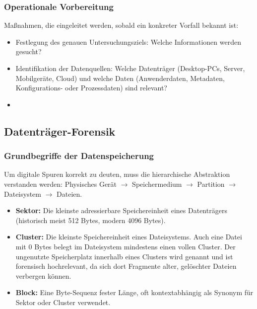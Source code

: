 \documentclass[
../../css_summary.tex,
]{subfiles}
\begin{document}
\subsubsection{Operationale Vorbereitung}
Maßnahmen, die eingeleitet werden, sobald ein konkreter Vorfall bekannt ist:
\begin{itemize}
  \item Festlegung des genauen Untersuchungsziels: Welche Informationen werden gesucht?
  \item Identifikation der Datenquellen: Welche Datenträger (Desktop-PCs, Server, Mobilgeräte, Cloud) und welche Daten (Anwenderdaten, Metadaten, Konfigurations- oder Prozessdaten) sind relevant?
  \item %
\end{itemize}

\subsection{Datenträger-Forensik}

\subsubsection{Grundbegriffe der Datenspeicherung}
Um digitale Spuren korrekt zu deuten, muss die hierarchische Abstraktion verstanden werden: Physisches Gerät $\rightarrow$ Speichermedium $\rightarrow$ Partition $\rightarrow$ Dateisystem $\rightarrow$ Dateien.

\begin{defbox}[Speichereinheiten]
  \begin{itemize}
    \item \textbf{Sektor:} Die kleinste  adressierbare Speichereinheit eines Datenträgers (historisch meist 512 Bytes, modern 4096 Bytes).
    \item \textbf{Cluster:} Die kleinste  Speichereinheit eines Dateisystems. Auch eine Datei mit $0$ Bytes belegt im Dateisystem mindestens einen vollen Cluster. Der ungenutzte Speicherplatz innerhalb eines Clusters wird  genannt und ist forensisch hochrelevant, da sich dort Fragmente alter, gelöschter Dateien verbergen können.
    \item \textbf{Block:} Eine Byte-Sequenz fester Länge, oft kontextabhängig als Synonym für Sektor oder Cluster verwendet.
  \end{itemize}
\end{defbox}
\end{document}
